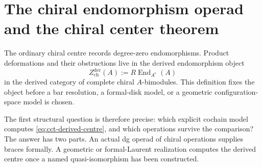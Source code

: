 
\section{The chiral endomorphism operad and the chiral center theorem}
\label{sec:chiral-center-theorem}


The ordinary chiral centre records degree-zero endomorphisms.  Product
deformations and their obstructions live in the derived endomorphism
object
\begin{equation}\label{eq:cct-derived-centre}
 Z^{\mathrm{der}}_{\mathrm{ch}}(A)
 :=
 R\operatorname{End}_{A^e}(A)
\end{equation}
in the derived category of complete chiral \(A\)-bimodules.  This
definition fixes the object before a bar resolution, a formal-disk
model, or a geometric configuration-space model is chosen.

The first structural question is therefore precise: which explicit
cochain model computes \eqref{eq:cct-derived-centre}, and which
operations survive the comparison?  The answer has two parts.  An
actual dg operad of chiral operations supplies braces formally.
A geometric or formal-Laurent realization computes the derived centre
once a named quasi-isomorphism has been constructed.

